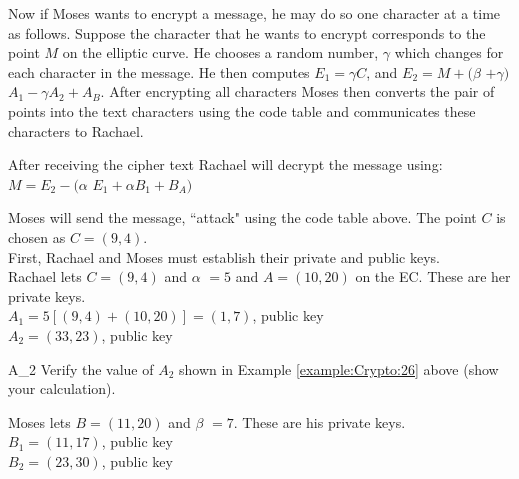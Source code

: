 Now if Moses wants to encrypt a message, he may do so one character at a time as follows. Suppose the character that he wants to encrypt corresponds to the point $M$ on the elliptic curve.   He chooses a random number, $\gamma$ which changes for each character in the message. He then computes $E_1 =$$\gamma$$C$, and $E_2 = M +($$\beta$ $+$$\gamma$$)$$A_1 -$$\gamma$$A_2 + A_B$. After encrypting all characters Moses then converts the pair of points into the text characters using the code table and communicates these characters to Rachael.

After receiving the cipher text Rachael will decrypt the message using:\\
$M = E_2 - ($$\alpha$ $E_1 +$$\alpha$$B_1 +B_A)$\\

\begin{example}{26} Moses will send the message, ``attack" using the code table above. The point $C$ is chosen as $C = (9,4)$.\\
First, Rachael and Moses must establish their private and public keys.\\
Rachael lets $C = (9,4)$ and $\alpha$ $= 5$ and $A = (10, 20)$ on the EC. These are her private keys.\\
	$A_1 = 5[(9, 4) + (10, 20)] = (1, 7)$, public key\\
	$A_2 = (33, 23)$, public key

\begin{exercise}{A_2} Verify the value of $A_2$ shown in Example \ref{example:Crypto:26} above (show your calculation).
\end{exercise}
Moses lets $B = (11, 20)$ and $\beta$ $= 7$. These are his private keys. \\
	$B_1 = (11, 17)$, public key\\
	$B_2 = (23, 30)$, public key


\end{example}
